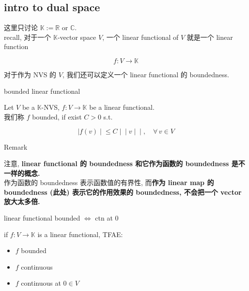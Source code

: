 \documentclass{qlnotes-export}
\begin{document}
\subsection{intro to dual space}\label{intro-to-dual-space}

这里只讨论 \({\mathbb{K}} := {\mathbb{R}}\) or \(\mathbb{C}\).\\
recall, 对于一个 \(\mathbb{K}\)-vector space \(V\), 一个 linear functional of \(V\) 就是一个 linear function

\[f:V\rightarrow{\mathbb{K}}\]

对于作为 NVS 的 \(V\), 我们还可以定义一个 linear functional 的 boundedness.

\begin{definition}{bounded linear functional}\label{def-13-the-dual-of-l-p-spaces-bounded-linear-functional}

Let \(V\) be a \(\mathbb{K}\)-NVS, \(f:V\rightarrow{\mathbb{K}}\) be a linear functional.\\
我们称 \(f\) bounded, if exist \(C > 0\) s.t.

\[\left. |f(v) \middle| \leq C \middle| \middle| v \middle| \middle| ,\quad\forall\, v \in V \right.\]

\end{definition}

\begin{qlremark}{Remark}

注意, \textbf{linear functional 的 boundedness 和它作为函数的 boundedness 是不一样的概念.}\\
作为函数的 boundedness 表示函数值的有界性, 而\textbf{作为 linear map 的 boundedness (此处) 表示它的作用效果的 boundedness, 不会把一个 vector 放大太多倍.}

\end{qlremark}

\begin{proposition}{linear functional bounded \(\Leftrightarrow\) ctn at \(0\)}\label{prop-13-the-dual-of-l-p-spaces-linear-functional-bounded-iff-ctn-at-0}

if \(f:V\rightarrow{\mathbb{K}}\) is a linear functional, TFAE:

\begin{itemize}
\item
  \(f\) bounded
\item
  \(f\) continuous
\item
  \(f\) continuous at \(0 \in V\)
\end{itemize}

\end{proposition}
\end{document}
